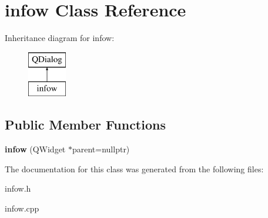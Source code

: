 \hypertarget{classinfow}{}\section{infow Class Reference}
\label{classinfow}
Inheritance diagram for infow\+:\begin{figure}[H]
\begin{center}
\leavevmode
\includegraphics[height=2.000000cm]{classinfow}
\end{center}
\end{figure}
\subsection*{Public Member Functions}
\begin{DoxyCompactItemize}
\item 
\mbox{\label{classinfow_a0f2e71fb5dfc2da8aead85642eb1b38e}} 
{\bfseries infow} (Q\+Widget $\ast$parent=nullptr)
\end{DoxyCompactItemize}


The documentation for this class was generated from the following files\+:\begin{DoxyCompactItemize}
\item 
infow.\+h\item 
infow.\+cpp\end{DoxyCompactItemize}

